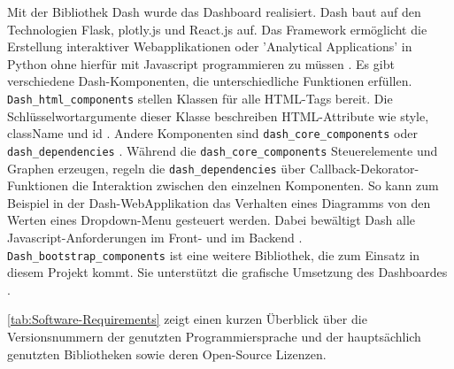     Mit der Bibliothek Dash wurde das Dashboard realisiert. Dash baut auf den Technologien Flask, plotly.js und React.js auf. Das Framework ermöglicht die Erstellung interaktiver Webapplikationen 
    oder 'Analytical Applications' in Python ohne hierfür mit Javascript programmieren zu müssen \cite[vgl.][]{plotly_dash_2021}.
    Es gibt verschiedene Dash-Komponenten, die unterschiedliche Funktionen erfüllen. \texttt{Dash\_html\_components} stellen Klassen für alle HTML-Tags bereit.
    Die Schlüsselwortargumente dieser Klasse beschreiben HTML-Attribute wie style, className und id \cite[vgl.][]{plotly_dash_2021-2}. 
    Andere Komponenten sind \texttt{dash\_core\_components} oder \texttt{dash\_dependencies} \cite[vgl.][]{plotly_dash_2021-1}. Während die \texttt{dash\_core\_components}
    Steuerelemente und Graphen erzeugen, regeln die \texttt{dash\_dependencies} über Callback-Dekorator-Funktionen die Interaktion zwischen den einzelnen Komponenten.
    So kann zum Beispiel in der Dash-WebApplikation das Verhalten eines Diagramms von den Werten eines Dropdown-Menu gesteuert werden. 
    Dabei bewältigt Dash alle Javascript-Anforderungen im Front- und im Backend \cite[vgl.][]{plotly_dash_2021-3}.
    \texttt{Dash\_bootstrap\_components} ist eine weitere Bibliothek, die zum Einsatz in diesem Projekt kommt. Sie unterstützt die grafische Umsetzung
    des Dashboardes \cite[vgl.][]{faculty_dash_2021}.

    \autoref{tab:Software-Requirements} zeigt einen kurzen Überblick über die Versionsnummern der genutzten Programmiersprache und der hauptsächlich 
    genutzten Bibliotheken sowie deren Open-Source Lizenzen.
    
